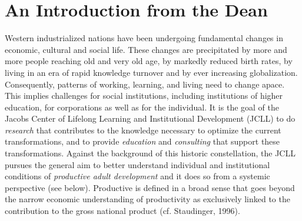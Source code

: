 \section{An Introduction from the Dean} 

Western industrialized nations have been undergoing fundamental changes in economic, cultural and social life. These changes are precipitated by more and more people reaching old and very old age, by markedly reduced birth rates, by living in an era of rapid knowledge turnover and by ever increasing globalization. Consequently, patterns of working, learning, and living need to change apace. This implies challenges for social institutions, including institutions of higher education, for corporations as well as for the individual. It is the goal of the Jacobs Center of Lifelong Learning and Institutional Development (JCLL) to do \textit{research} that contributes to the knowledge necessary to optimize the current transformations, and to provide \textit{education} and \textit{consulting} that support these transformations. Against the background of this historic constellation, the JCLL pursues the general aim to better understand individual and institutional conditions of \textit{productive adult development} and it does so from a systemic perspective (see below). Productive is defined in a broad sense that goes beyond the narrow economic understanding of productivity as exclusively linked to the contribution to the gross national product (cf. Staudinger, 1996).




